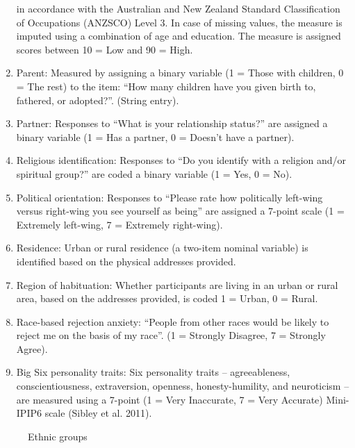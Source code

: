 \documentclass[
]{interact}
\begin{document}
\begin{enumerate}
  in accordance with the Australian and New Zealand Standard
  Classification of Occupations (ANZSCO) Level 3. In case of missing
  values, the measure is imputed using a combination of age and
  education. The measure is assigned scores between 10 = Low and 90 =
  High.
\item
  Parent: Measured by assigning a binary variable (1 = Those with
  children, 0 = The rest) to the item: ``How many children have you
  given birth to, fathered, or adopted?''. (String entry).
\item
  Partner: Responses to ``What is your relationship status?'' are
  assigned a binary variable (1 = Has a partner, 0 = Doesn't have a
  partner).
\item
  Religious identification: Responses to ``Do you identify with a
  religion and/or spiritual group?'' are coded a binary variable (1 =
  Yes, 0 = No).
\item
  Political orientation: Responses to ``Please rate how politically
  left-wing versus right-wing you see yourself as being'' are assigned a
  7-point scale (1 = Extremely left-wing, 7 = Extremely right-wing).
\item
  Residence: Urban or rural residence (a two-item nominal variable) is
  identified based on the physical addresses provided.
\item
  Region of habituation: Whether participants are living in an urban or
  rural area, based on the addresses provided, is coded 1 = Urban, 0 =
  Rural.
\item
  Race-based rejection anxiety: ``People from other races would be
  likely to reject me on the basis of my race''. (1 = Strongly Disagree,
  7 = Strongly Agree).
\item
  Big Six personality traits: Six personality traits -- agreeableness,
  conscientiousness, extraversion, openness, honesty-humility, and
  neuroticism -- are measured using a 7-point (1 = Very Inaccurate, 7 =
  Very Accurate) Mini-IPIP6 scale (Sibley et al. 2011).
\end{enumerate}

\begin{figure}


\caption{\label{fig-ethnicgroups}Ethnic groups}

\end{figure}%
\end{document}
